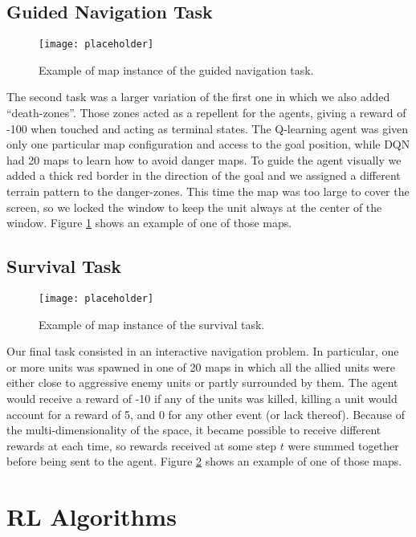 \subsection{Guided Navigation Task}

\begin{figure}[h]
    \centering
    \texttt{[image: placeholder]}
    \caption{Example of map instance of the guided navigation task.}
    \label{fig:guid_task}
\end{figure}

The second task was a larger variation of the first one in which we also added
``death-zones''. Those zones acted as a repellent for the agents, giving a
reward of -100 when touched and acting as terminal states. The Q-learning agent
was given only one particular map configuration and access to the goal position,
while DQN had 20 maps to learn how to avoid danger maps. To guide the agent
visually we added a thick red border in the direction of the goal and we
assigned a different terrain pattern to the danger-zones. This time the map was
too large to cover the screen, so we locked the window to keep the unit always
at the center of the window. Figure \ref{fig:guid_task} shows an example of one
of those maps.

\subsection{Survival Task}

\begin{figure}[h]
    \centering
    \texttt{[image: placeholder]}
    \caption{Example of map instance of the survival task.}
    \label{fig:surv_task}
\end{figure}

Our final task consisted in an interactive navigation problem. In particular,
one or more units was spawned in one of 20 maps in which all the allied units
were either close to aggressive enemy units or partly surrounded by them.
The agent would receive a reward of -10 if any of the units was killed, killing
a unit would account for a reward of 5, and 0 for any other event (or lack
thereof). Because of the multi-dimensionality of the space, it became possible
to receive different rewards at each time, so rewards received at some step $t$
were summed together before being sent to the agent. Figure \ref{fig:surv_task}
shows an example of one of those maps.

\section{RL Algorithms}

